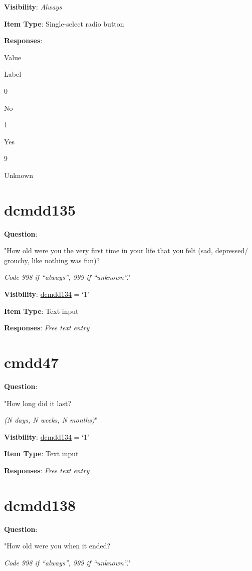 \documentclass[]{book}
\begin{document}
\textbf{Visibility}: \emph{Always}

\textbf{Item Type}: Single-select radio button

\textbf{Responses}:

Value

Label

0

No

1

Yes

9

Unknown

\hypertarget{dcmdd135}{%
\section{dcmdd135}\label{dcmdd135}}

\textbf{Question}:

"How old were you the very first time in your life that you felt (sad, depressed/ grouchy, like nothing was fun)?

\emph{Code 998 if ``always'', 999 if ``unknown''.}"

\textbf{Visibility}: \protect\hyperlink{dcmdd134}{dcmdd134} = `1'

\textbf{Item Type}: Text input

\textbf{Responses}: \emph{Free text entry}

\hypertarget{cmdd47}{%
\section{cmdd47}\label{cmdd47}}

\textbf{Question}:

"How long did it last?

\emph{(N days, N weeks, N months)}"

\textbf{Visibility}: \protect\hyperlink{dcmdd134}{dcmdd134} = `1'

\textbf{Item Type}: Text input

\textbf{Responses}: \emph{Free text entry}

\hypertarget{dcmdd138}{%
\section{dcmdd138}\label{dcmdd138}}

\textbf{Question}:

"How old were you when it ended?

\emph{Code 998 if ``always'', 999 if ``unknown''.}"
\end{document}
